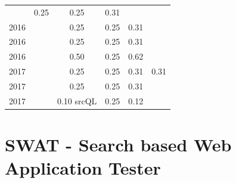 \begin{table}[H]
\begin{tabular}{| l | c | c | c | c | c |}
          &
          0.25
          &
          0.25
          &
          0.31
          &
          \\
            2016
          &
          
          &
          0.25
          &
          0.25
          &
          0.31
          &
          \\
            2016
          &
          
          &
          0.25
          &
          0.25
          &
          0.31
          &
          \\
            2016
          &
          
          &
          0.50
          &
          0.25
          &
          0.62
          &
          \\
\hline
            2017
          &
          
          &
          0.25
          &
          0.25
          &
          0.31
          &
            {\color{red} 0.31}
          \\
            2017
          &
          
          &
          0.25
          &
          0.25
          &
          0.31
          &
          \\
            2017
          &
          
          &
          0.10
            {\tiny srcQL}
          &
          0.25
          &
          0.12
          &
          \\
\hline
\end{tabular}
\end{table}



\section{SWAT - Search based Web Application Tester}


